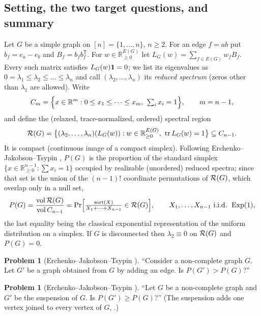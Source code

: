 \documentclass[11pt]{amsart}
\theoremstyle{definition}
\newtheorem{problem}[theorem]{Problem}
\theoremstyle{remark}
\providecommand{\R}{\mathbb R}
\begin{document}
\subsection{Setting, the two target questions, and summary}
\label{R4:subsec:setting}

Let $G$ be a simple graph on $[n]=\{1,\dots,n\}$, $n\ge 2$.  For an edge
$f=ab$ put $b_f=e_a-e_b$ and $B_f=b_fb_f^{\mathsf T}$.  For
$w\in\R_{\ge0}^{E(G)}$ let $L_G(w)=\sum_{f\in E(G)}w_fB_f$.  Every such
matrix satisfies $L_G(w)\mathbf{1}=0$; we list its eigenvalues as
$0=\lambda_1\le\lambda_2\le\dots\le\lambda_n$ and call
$(\lambda_2,\dots,\lambda_n)$ its \emph{reduced spectrum} (zeros other than
$\lambda_1$ are allowed).  Write
\[
 C_{m}=\Bigl\{x\in\R^{m}:0\le x_1\le\dots\le x_{m},\ \textstyle\sum_i x_i=1\Bigr\},
 \qquad m=n-1,
\]
and define the (relaxed, trace-normalized, ordered) spectral region
\[
 \RG(G)=\bigl\{(\lambda_2,\dots,\lambda_n)(L_G(w)) : w\in\R_{\ge0}^{E(G)},\
 \tr L_G(w)=1\bigr\}\subseteq C_{n-1}.
\]
It is compact (continuous image of a compact simplex).  Following
Erchenko--Jakobson--Tsypin \cite[Section~8]{R4-EJT}, $P(G)$ is the
proportion of the standard simplex
$\{x\in\R^{n-1}_{\ge0}:\sum x_i=1\}$ occupied by realizable
(unordered) reduced spectra; since that set is the union of the $(n-1)!$
coordinate permutations of $\mathcal{R}(G)$, which overlap only in a null set,
\begin{equation}\label{R4:eq:P}
 P(G)=\frac{\operatorname{vol}\mathcal{R}(G)}{\operatorname{vol}C_{n-1}}
 =\Pr\Bigl[\tfrac{\operatorname{sort}(X)}{X_1+\dots+X_{n-1}}\in\mathcal{R}(G)\Bigr],
 \qquad X_1,\dots,X_{n-1}\ \text{i.i.d. }\operatorname{Exp}(1),
\end{equation}
the last equality being the classical exponential representation of the
uniform distribution on a simplex.  If $G$ is disconnected then
$\lambda_2\equiv0$ on $\mathcal{R}(G)$ and $P(G)=0$.

\begin{problem}[Erchenko--Jakobson--Tsypin {\cite[Section~8, Question~3]{R4-EJT}}]
\label{R4:prob:Q3}
``Consider a non-complete graph $G$. Let $G'$ be a graph obtained from $G$
by adding an edge. Is $P(G')>P(G)$?''
\end{problem}

\begin{problem}[Erchenko--Jakobson--Tsypin {\cite[Section~8, Question~4]{R4-EJT}}]
\label{R4:prob:Q4}
``Let $G$ be a non-complete graph and $G'$ be the suspension of $G$. Is
$P(G')\ge P(G)$?''  (The suspension adds one vertex joined to every vertex
of $G$, \cite[Definition~7.2]{R4-EJT}.)
\end{problem}
\end{document}
